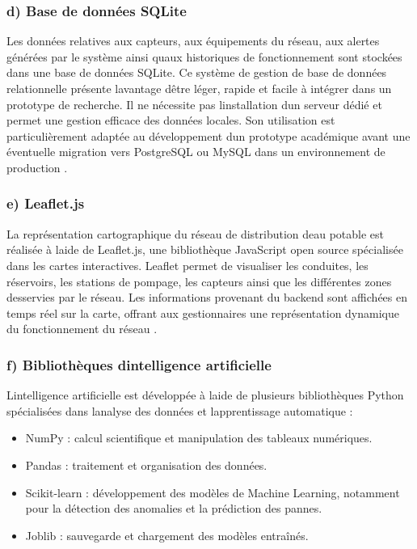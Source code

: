\documentclass[12pt,a4paper,oneside]{report}
\begin{document}
\subsubsection{d) Base de données
SQLite}\label{d-base-de-donnuxe9es-sqlite}

Les données relatives aux capteurs, aux équipements du réseau, aux
alertes générées par le système ainsi qu\textquotesingle aux historiques
de fonctionnement sont stockées dans une base de données SQLite. Ce
système de gestion de base de données relationnelle présente
l\textquotesingle avantage d\textquotesingle être léger, rapide et
facile à intégrer dans un prototype de recherche. Il ne nécessite pas
l\textquotesingle installation d\textquotesingle un serveur dédié et
permet une gestion efficace des données locales. Son utilisation est
particulièrement adaptée au développement d\textquotesingle un prototype
académique avant une éventuelle migration vers PostgreSQL ou MySQL dans
un environnement de production \cite{ref118}.

\subsubsection{e) Leaflet.js}\label{e-leaflet.js}

La représentation cartographique du réseau de distribution
d\textquotesingle eau potable est réalisée à l\textquotesingle aide de
Leaflet.js, une bibliothèque JavaScript open source spécialisée dans les
cartes interactives. Leaflet permet de visualiser les conduites, les
réservoirs, les stations de pompage, les capteurs ainsi que les
différentes zones desservies par le réseau. Les informations provenant
du backend sont affichées en temps réel sur la carte, offrant aux
gestionnaires une représentation dynamique du fonctionnement du réseau
\cite{ref119}.

\subsubsection{f) Bibliothèques d\textquotesingle intelligence
artificielle}\label{f-bibliothuxe8ques-dintelligence-artificielle}

L\textquotesingle intelligence artificielle est développée à
l\textquotesingle aide de plusieurs bibliothèques Python spécialisées
dans l\textquotesingle analyse des données et
l\textquotesingle apprentissage automatique :

\begin{itemize}
\item
  NumPy : calcul scientifique et manipulation des tableaux numériques.
\item
  Pandas : traitement et organisation des données.
\item
  Scikit-learn : développement des modèles de Machine Learning,
  notamment pour la détection des anomalies et la prédiction des pannes.
\item
  Joblib : sauvegarde et chargement des modèles entraînés.
\end{itemize}
\end{document}
